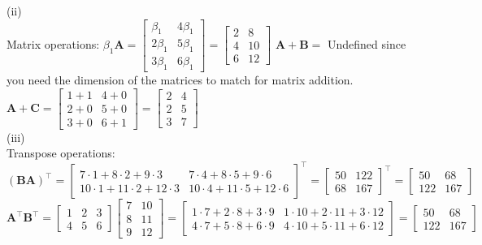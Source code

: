 \documentclass[11pt]{article}
\begin{document}
(ii)\\
Matrix operations: $\beta_1 \mathbf{A} = \begin{bmatrix}\beta_1 & 4 \beta_1\\ 2\beta_1 & 5\beta_1\\ 3\beta_1 & 6\beta_1\end{bmatrix} = 
\begin{bmatrix}2&8\\4&10\\6&12 \end{bmatrix}$  \quad
$\mathbf{A}+\mathbf{B}=$ Undefined since you need the dimension of the matrices to match for matrix addition.\\
$\mathbf{A}+\mathbf{C} = \begin{bmatrix}1+1 & 4+0\\ 2+0 & 5+0\\ 3+0 & 6+1\end{bmatrix} = \begin{bmatrix}2&4\\2&5\\3&7 \end{bmatrix}$\\
(iii)\\
Transpose operations: $(\mathbf{B}\mathbf{A})^\top = \begin{bmatrix}
    7\cdot 1+8\cdot 2 + 9\cdot 3 & 7 \cdot 4+8\cdot 5+9\cdot 6\\
    10\cdot 1+11\cdot 2+12\cdot 3 & 10\cdot 4 + 11\cdot 5 + 12\cdot 6
\end{bmatrix}^\top= \begin{bmatrix}
    50 & 122\\
    68 & 167
\end{bmatrix}^\top = \begin{bmatrix}50 & 68\\ 122 & 167 \end{bmatrix}$\\
$\mathbf{A}^\top \mathbf{B}^\top=\begin{bmatrix}1&2&3\\4&5&6\end{bmatrix}\begin{bmatrix}7&10\\8&11\\9&12\end{bmatrix}=
\begin{bmatrix}
    1 \cdot 7 + 2\cdot 8 + 3\cdot 9 & 1 \cdot 10 + 2\cdot 11 + 3\cdot 12\\
    4\cdot 7 + 5\cdot 8 + 6\cdot 9 & 4\cdot 10 + 5\cdot 11 + 6\cdot 12
\end{bmatrix} = \begin{bmatrix}
    50 & 68\\
    122 & 167
\end{bmatrix}$\\
\end{document}
